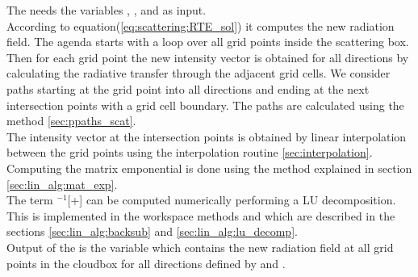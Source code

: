 \label{sec:scattering:scat_field_ag}

\label{sec:scattering:RT_ag}
The  needs the variables
, , 
and   as input.\\ 
According to equation(\ref{eq:scattering:RTE_sol}) it computes the new
radiation field. The agenda starts with a loop over all grid points
inside the scattering box. Then for each grid point the new intensity
vector
 \StoVec  is obtained for all directions by calculating the
radiative transfer through the adjacent grid cells. We consider paths
starting at the grid point into all directions and ending at the next
intersection points with a grid cell boundary. The paths are calculated
using the method \ref{sec:ppaths_scat}.\\
 The intensity vector at
the intersection points  is obtained by linear interpolation
between the grid points using the interpolation routine
\ref{sec:interpolation}. \\
Computing the matrix emponential is done using the method
 explained in section
\ref{sec:lin_alg:mat_exp}.\\
 The term
\ExtMat$^{-1}$[\AbsVec\Planck+\ScaInt] can be computed numerically  
performing a LU decomposition. This is implemented in the workspace
methods  and  which are described
in the sections \ref{sec:lin_alg:backsub} and
\ref{sec:lin_alg:lu_decomp}. \\
Output of the  is the variable 
 which contains the new radiation field at all
grid points in the cloudbox for all directions defined by 
 and .

\label{sec:scattering:conv_method}





 


